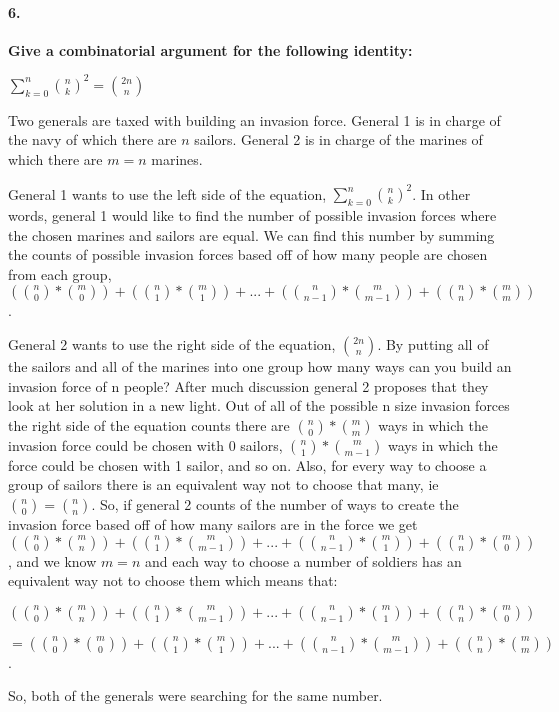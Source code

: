 \documentclass{article}
\begin{document}
\pagebreak

\paragraph{6. }
\textbf{Give a combinatorial argument for the following identity:}
\begin{center}
$\sum\limits_{k=0}^n {n \choose k}^2 = {2n \choose n}$
\end{center}
Two generals are taxed with building an invasion force. General 1 is in charge of the navy of which there are $n$ sailors. General 2 is in charge of the marines of which there are ${m = n}$ marines. 

General 1 wants to use the left side of the equation, ${\sum\limits_{k=0}^n {n \choose k}^2}$. In other words, general 1 would like to find the number of possible invasion forces where the chosen marines and sailors are equal. We can find this number by summing the counts of possible invasion forces based off of how many people are chosen from each group, ${ ({n \choose 0} * {m \choose 0}) + ({n \choose 1} * {m \choose 1}) + ... + ({n \choose n-1} * {m \choose m-1}) + ({n \choose n} * {m \choose m})}$.

General 2 wants to use the right side of the equation, ${2n \choose n}$. By putting all of the sailors and all of the marines into one group how many ways can you build an invasion force of n people?
After much discussion general 2 proposes that they look at her solution in a new light. Out of all of the possible n size invasion forces the right side of the equation counts there are ${ {n \choose 0} * {m \choose m}}$ ways in which the invasion force could be chosen with 0 sailors, ${ {n \choose 1} * {m \choose m-1}}$ ways in which the force could be chosen with 1 sailor, and so on. Also, for every way to choose a group of sailors there is an equivalent way not to choose that many, ie ${ {n \choose 0} = {n \choose n}}$. So, if general 2 counts of the number of ways to create the invasion force based off of how many sailors are in the force we get ${ ({n \choose 0} * {m \choose n}) + ({n \choose 1} * {m \choose m-1}) + ... + ({n \choose n-1} * {m \choose 1}) + ({n \choose n} * {m \choose 0})}$, and we know ${m = n}$ and each way to choose a number of soldiers has an equivalent way not to choose them which means that: 

${ ({n \choose 0} * {m \choose n}) + ({n \choose 1} * {m \choose m-1}) + ... + ({n \choose n-1} * {m \choose 1}) + ({n \choose n} * {m \choose 0})}$ 

${= ({n \choose 0} * {m \choose 0}) + ({n \choose 1} * {m \choose 1}) + ... + ({n \choose n-1} * {m \choose m-1}) + ({n \choose n} * {m \choose m})}$. 

So, both of the generals were searching for the same number.
\end{document}
